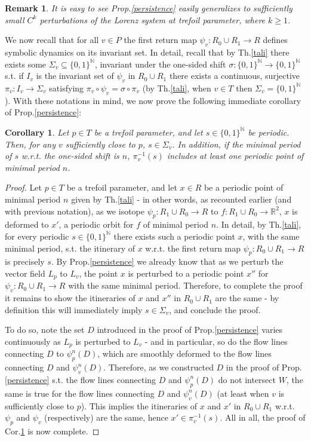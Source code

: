 \documentclass[10pt,reqno]{amsart}
\theoremstyle{plain}
\theoremstyle{assumption}
\theoremstyle{notation}
\theoremstyle{claim}
\theoremstyle{conj}
\newtheorem{remark}{\textbf{Remark}}[section]
\theoremstyle{theorem}
\theoremstyle{proposition}
\theoremstyle{corollary}
\newtheorem{corollary}{Corollary}[section]
\begin{document}
\begin{remark}
\label{gen1}    It is easy to see Prop.\ref{persistence} easily generalizes to sufficiently small $C^k$ perturbations of the Lorenz system at trefoil parameter, where $k\geq1$. 
\end{remark}
We now recall that for all $v\in P$ the first return map $\psi_v:R_0\cup R_1\to R$ defines symbolic dynamics on its invariant set. In detail, recall that by Th.\ref{tali} there exists some $\Sigma_v\subseteq\{0,1\}^\mathbb{N}$, invariant under the one-sided shift $\sigma:\{0,1\}^\mathbb{N}\to\{0,1\}^\mathbb{N}$ s.t. if $I_v$ is the invariant set of $\psi_v$ in $R_0\cup R_1$ there exists a continuous, surjective $\pi_v:I_v\to\Sigma_v$ satisfying $\pi_v\circ \psi_v=\sigma\circ\pi_v$ (by Th.\ref{tali}, when $v\in T$ then $\Sigma_v=\{0,1\}^\mathbb{N}$). With these notations in mind, we now prove the following immediate corollary of Prop.\ref{persistence}:
\begin{corollary}
    \label{pers1} Let $p\in T$ be a trefoil parameter, and let $s\in\{0,1\}^\mathbb{N}$ be periodic. Then, for any $v$ sufficiently close to $p$, $s\in\Sigma_v$. In addition, if the minimal period of $s$ w.r.t. the one-sided shift is $n$, $\pi^{-1}_v(s)$ includes at least one periodic point of minimal period $n$.
\end{corollary}
\begin{proof}
    Let $p\in T$ be a trefoil parameter, and let $x\in R$ be a periodic point of minimal period $n$ given by Th.\ref{tali} - in other words, as recounted earlier (and with previous notation), as we isotope $\psi_p:R_1\cup R_0\to R$ to $f:R_1\cup R_0\to\mathbb{R}^2$, $x$ is deformed to $x'$, a periodic orbit for $f$ of minimal period $n$. In detail, by Th.\ref{tali}, for every periodic $s\in\{0,1\}^\mathbb{N}$ there exists such a periodic point $x$, with the same minimal period, s.t. the itinerary of $x$ w.r.t. the first return map $\psi_p:R_0\cup R_1\to R$ is precisely $s$. By Prop.\ref{persistence} we already know that as we perturb the vector field $L_p$ to $L_v$, the point $x$ is perturbed to a periodic point $x''$ for $\psi_v:R_0\cup R_1\to R$ with the same minimal period. Therefore, to complete the proof it remains to show the itineraries of $x$ and $x''$ in $R_0\cup R_1$ are the same - by definition this will immediately imply $s\in\Sigma_v$, and conclude the proof.
    
    To do so, note the set $D$ introduced in the proof of Prop.\ref{persistence} varies continuously as $L_p$ is perturbed to $L_v$ - and in particular, so do the flow lines connecting $D$ to $\psi^n_p(D)$, which are smoothly deformed to the flow lines connecting $D$ and $\psi^n_v(D)$. Therefore, as we constructed $D$ in the proof of Prop.\ref{persistence} s.t. the flow lines connecting $D$ and $\psi^n_p(D)$ do not intersect $W$, the same is true for the flow lines connecting $D$ and $\psi^n_v(D)$ (at least when $v$ is sufficiently close to $p$). This implies the itineraries of $x$ and $x'$ in $R_0\cup R_1$ w.r.t. $\psi_p$ and $\psi_v$ (respectively) are the same, hence $x'\in\pi^{-1}_v(s)$. All in all, the proof of Cor.\ref{pers1} is now complete.
\end{proof}
\end{document}
